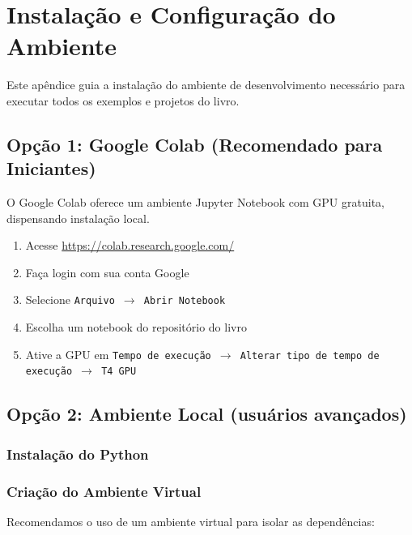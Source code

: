 \chapter{Instalação e Configuração do Ambiente}
\label{apendice:instalacao}

Este apêndice guia a instalação do ambiente de desenvolvimento necessário
para executar todos os exemplos e projetos do livro.

\section{Opção 1: Google Colab (Recomendado para Iniciantes)}

O Google Colab oferece um ambiente Jupyter Notebook com GPU gratuita,
dispensando instalação local.

\begin{enumerate}
  \item Acesse \url{https://colab.research.google.com/}
  \item Faça login com sua conta Google
  \item Selecione \texttt{Arquivo $\rightarrow$ Abrir Notebook}
  \item Escolha um notebook do repositório do livro
  \item Ative a GPU em \texttt{Tempo de execução $\rightarrow$ Alterar
    tipo de tempo de execução $\rightarrow$ T4 GPU}
\end{enumerate}

\section{Opção 2: Ambiente Local (usuários avançados)}

\subsection{Instalação do Python}


\subsection{Criação do Ambiente Virtual}

Recomendamos o uso de um ambiente virtual para isolar as dependências:

